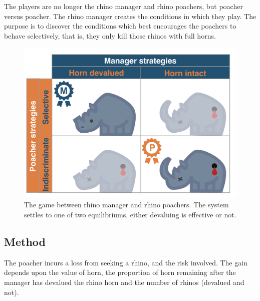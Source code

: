 \documentclass[10pt]{article}
\begin{document}
The players are no longer the rhino manager and rhino poachers, but poacher versus poacher. The rhino manager creates the conditions in which they play. The purpose is to discover the conditions which best encourages the poachers to behave selectively, that is, they only kill those rhinos with full horns.
\begin{figure}
\centering
\includegraphics[scale=0.2]{RhinoPic.pdf}
\caption{\label{fig:RhinoPic} The game between rhino manager and rhino poachers. The system settles to one of two equilibriums, either devaluing is effective or not. }
\end{figure}
\subsection{Method}

The poacher incurs a loss from seeking a rhino, and the risk involved. The gain depends upon the value of horn, the proportion of horn remaining after the manager has devalued the rhino horn and the number of rhinos (devalued and not).
\end{document}
